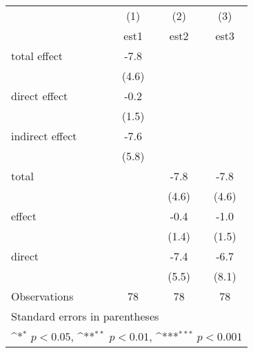 {
\def\sym#1{\ifmmode^{#1}\else\(^{#1}\)\fi}
\begin{tabular}{l*{3}{c}}
\hline\hline
                &\multicolumn{1}{c}{(1)}         &\multicolumn{1}{c}{(2)}         &\multicolumn{1}{c}{(3)}         \\
                &     est1         &     est2         &     est3         \\
\hline
total effect       &     -7.8         &                  &                  \\
                &    (4.6)         &                  &                  \\
direct effect      &     -0.2         &                  &                  \\
                &    (1.5)         &                  &                  \\
indirect effect    &     -7.6         &                  &                  \\
                &    (5.8)         &                  &                  \\
total           &                  &     -7.8         &     -7.8         \\
                &                  &    (4.6)         &    (4.6)         \\
effect          &                  &     -0.4         &     -1.0         \\
                &                  &    (1.4)         &    (1.5)         \\
direct          &                  &     -7.4         &     -6.7         \\
                &                  &    (5.5)         &    (8.1)         \\
\hline
Observations    &       78         &       78         &       78         \\
\hline\hline
\multicolumn{4}{l}{\footnotesize Standard errors in parentheses}\\
\multicolumn{4}{l}{\footnotesize \sym{*} \(p<0.05\), \sym{**} \(p<0.01\), \sym{***} \(p<0.001\)}\\
\end{tabular}
}

